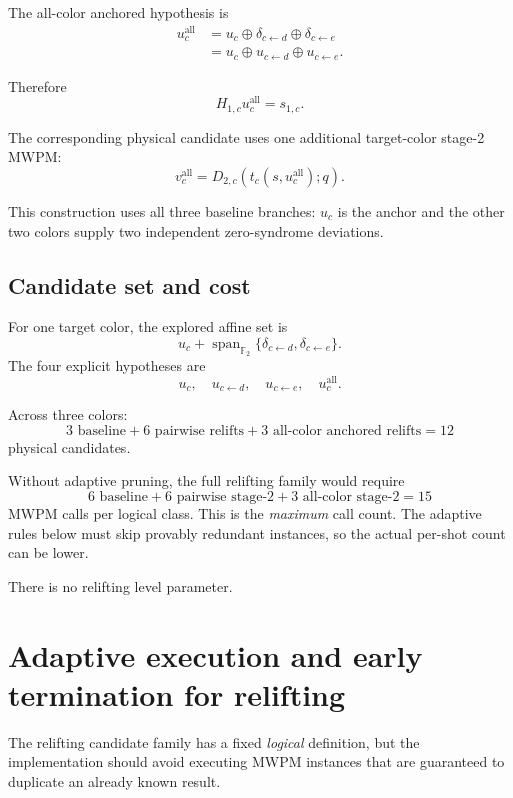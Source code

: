 \documentclass[11pt]{article}
\newcommand{\F}{\mathbb{F}_2}
\begin{document}
The all-color anchored hypothesis is
\begin{align}
    u_c^{\mathrm{all}}
    &=
    u_c
    \oplus
    \delta_{c\leftarrow d}
    \oplus
    \delta_{c\leftarrow e}
    \nonumber\\
    &=
    u_c
    \oplus
    u_{c\leftarrow d}
    \oplus
    u_{c\leftarrow e}.
    \tag{10}
\end{align}

Therefore
\[
    H_{1,c}u_c^{\mathrm{all}}=s_{1,c}.
    \tag{11}
\]

The corresponding physical candidate uses one additional target-color
stage-2 MWPM:
\[
    v_c^{\mathrm{all}}
    =
    D_{2,c}\left(t_c(s,u_c^{\mathrm{all}});q\right).
    \tag{12}
\]

This construction uses all three baseline branches: $u_c$ is the anchor and
the other two colors supply two independent zero-syndrome deviations.

\subsection{Candidate set and cost}

For one target color, the explored affine set is
\[
    u_c+
    \operatorname{span}_{\F}
    \{
      \delta_{c\leftarrow d},
      \delta_{c\leftarrow e}
    \}.
    \tag{13}
\]
The four explicit hypotheses are
\[
    u_c,\quad
    u_{c\leftarrow d},\quad
    u_{c\leftarrow e},\quad
    u_c^{\mathrm{all}}.
    \tag{14}
\]

Across three colors:
\[
    3\text{ baseline}
    +6\text{ pairwise relifts}
    +3\text{ all-color anchored relifts}
    =12
\]
physical candidates.

Without adaptive pruning, the full relifting family would require
\[
    6\text{ baseline}
    +6\text{ pairwise stage-2}
    +3\text{ all-color stage-2}
    =15
    \tag{15}
\]
MWPM calls per logical class.  This is the \emph{maximum} call count.  The
adaptive rules below must skip provably redundant instances, so the actual
per-shot count can be lower.

There is no relifting level parameter.


\section{Adaptive execution and early termination for relifting}

The relifting candidate family has a fixed \emph{logical} definition, but the
implementation should avoid executing MWPM instances that are guaranteed to
duplicate an already known result.
\end{document}
